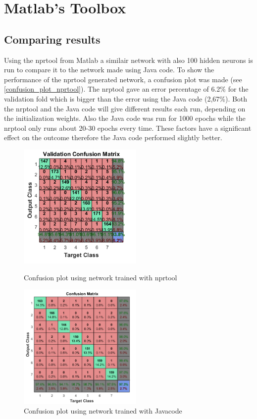 \section{Matlab's Toolbox} \label {chapter:matlabtoolbox}

\subsection{Comparing results}
Using the nprtool from Matlab a similair network with also 100 hidden neurons is run to compare it to the network made using Java code. To show the performance of the nprtool generated network, a confusion plot was made (see \cref{confusion_plot_nprtool}). The nrptool gave an error percentage of 6.2\% for the validation fold which is bigger than the error using the Java code (2,67\%). Both the nrptool and the Java code will give different results each run, depending on the initialization weights. Also the Java code was run for 1000 epochs while the nrptool only runs about 20-30 epochs every time. These factors have a significant effect on the outcome therefore the Java code performed slightly better.


\begin{figure}[!h]

\includegraphics[width=6cm]{testresults/nprtool.png}
\caption{Confusion plot using network trained with nprtool}
\label{confusion_plot_nprtool}

\includegraphics[width=6cm]{testresults/confusionplot.png}
\caption{Confusion plot using network trained with Javacode}
\label{confusion_plot_compare}


\end{figure}
\FloatBarrier